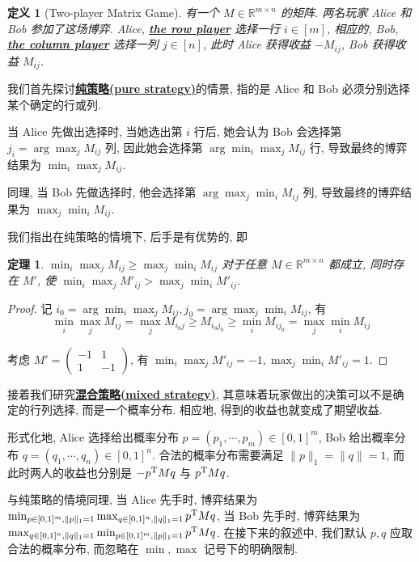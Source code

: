 \documentclass[8pt]{article}
\theoremstyle{compact}
\newtheorem{theorem}{定理}[section]
\newtheorem{definition}{定义}[section]
\def\obj#1{\textbf{\uline{#1}}}
\def\ge{\geqslant}
\begin{document}
\begin{definition}[Two-player Matrix Game]
	有一个 $M \in \mathbb R^{m \times n}$ 的矩阵. 两名玩家 Alice 和 Bob 参加了这场博弈. Alice, \obj{the row player} 选择一行 $i \in [m]$, 相应的, Bob, \obj{the column player} 选择一列 $j \in [n]$, 此时 Alice 获得收益 $-M_{ij}$, Bob 获得收益 $M_{ij}$.
\end{definition}

我们首先探讨\obj{纯策略(pure strategy)}的情景, 指的是 Alice 和 Bob 必须分别选择某个确定的行或列.

当 Alice 先做出选择时, 当她选出第 $i$ 行后, 她会认为 Bob 会选择第 $j_i = \arg\max_{j}M_{ij}$ 列, 因此她会选择第 $\arg\min_i\max_jM_{ij}$ 行, 导致最终的博弈结果为 $\min_i\max_jM_{ij}$.

同理, 当 Bob 先做选择时, 他会选择第 $\arg\max_j\min_iM_{ij}$ 列, 导致最终的博弈结果为 $\max_j\min_iM_{ij}$.

我们指出在纯策略的情境下, 后手是有优势的, 即

\begin{theorem}
	$\min_i\max_jM_{ij} \ge \max_j\min_iM_{ij}$ 对于任意 $M \in \mathbb R^{m \times n}$ 都成立, 同时存在 $M'$, 使 $\min_i\max_j{M'}_{ij} > \max_j\min_i{M'}_{ij}$.	
\end{theorem}
\begin{proof}
	记 $i_0 = \arg\min_i\max_jM_{ij}, j_0 = \arg\max_j\min_iM_{ij}$, 有 $$\min_i\max_jM_{ij} = \max_jM_{i_0j} \ge M_{i_0j_0} \ge \min_iM_{ij_0} = \max_j\min_iM_{ij}$$

	考虑 $M' = \begin{pmatrix}
		-1 & 1 \\ 1 & -1
	\end{pmatrix}$, 有 $\min_i\max_j{M'}_{ij} = -1, \max_j\min_i{M'}_{ij} = 1$.
\end{proof}

接着我们研究\obj{混合策略(mixed strategy)}, 其意味着玩家做出的决策可以不是确定的行列选择, 而是一个概率分布. 相应地, 得到的收益也就变成了期望收益.

形式化地, Alice 选择给出概率分布 $p = (p_1, \cdots, p_m) \in [0, 1]^m$, Bob 给出概率分布 $q = (q_1, \cdots, q_n) \in [0, 1]^n$. 合法的概率分布需要满足 $\|p\|_1 = \|q\| = 1$, 而此时两人的收益也分别是 $-p^{\text T}Mq$ 与 $p^{\text T}Mq$.

与纯策略的情境同理, 当 Alice 先手时, 博弈结果为 $\min_{p \in [0, 1]^m, \|p\|_1 = 1}\max_{q \in [0, 1]^n, \|q\|_1 = 1} p^{\text T}Mq$, 当 Bob 先手时, 博弈结果为 $\max_{q \in [0, 1]^n, \|q\|_1 = 1}\min_{p \in [0, 1]^m, \|p\|_1 = 1} p^{\text T}Mq$. 在接下来的叙述中, 我们默认 $p, q$ 应取合法的概率分布, 而忽略在 $\min, \max$ 记号下的明确限制.
\end{document}
